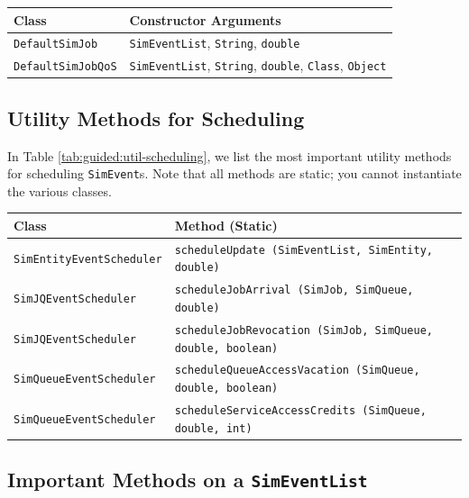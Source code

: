 \documentclass[12pt]{book}
\begin{document}
\begin{table}
\label{tab:guided:simjob-implementations}
\caption{Important \texttt{SimJob} Implementations.}
\begin{longtabu}{|l|l|}
\hline
Class & Constructor Arguments \\ \hline
\lstinline|DefaultSimJob|     & \lstinline|SimEventList|, \lstinline|String|, \lstinline|double|
  \\ \hline
\lstinline|DefaultSimJobQoS|  & \lstinline|SimEventList|, \lstinline|String|, \lstinline|double|, \lstinline|Class|, \lstinline|Object|
  \\ \hline
\end{longtabu}
\end{table}

\subsection{Utility Methods for Scheduling}

In Table \ref{tab:guided:util-scheduling},
  we list the most important utility methods for scheduling
  \lstinline|SimEvent|s.
Note that all methods are static; you cannot instantiate the
  various classes.

\begin{table}[h]
\label{tab:guided:util-scheduling}
\caption{Utility Methods for Scheduling.}
\begin{longtabu}{|l|l|}
\hline
Class & Method (Static) \\ \hline
\lstinline|SimEntityEventScheduler| & \lstinline|scheduleUpdate (SimEventList, SimEntity, double)|
  \\ \hline
\lstinline|SimJQEventScheduler|     & \lstinline|scheduleJobArrival (SimJob, SimQueue, double)|
  \\ \hline
\lstinline|SimJQEventScheduler|     & \lstinline|scheduleJobRevocation (SimJob, SimQueue, double, boolean)|
  \\ \hline
\lstinline|SimQueueEventScheduler|  & \lstinline|scheduleQueueAccessVacation (SimQueue, double, boolean)|
  \\ \hline
\lstinline|SimQueueEventScheduler|  & \lstinline|scheduleServiceAccessCredits (SimQueue, double, int)|
  \\ \hline
\end{longtabu}
\end{table}

\subsection{Important Methods on a \texttt{SimEventList}}
\end{document}
